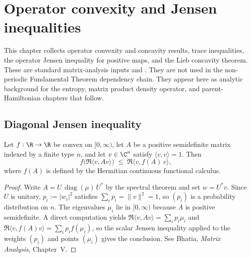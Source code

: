 
\chapter{Operator convexity and Jensen inequalities}\label{ch:operator_convexity}

This chapter collects operator convexity and concavity results, trace
inequalities, the operator Jensen inequality for positive maps, and the Lieb
concavity theorem. These are standard matrix-analysis inputs
\cite[Chapter~V]{Bhatia1997Matrix} and
\cite[Theorem~5.1]{Wolf2012Quantum}. They are not used in the non-periodic
Fundamental Theorem dependency chain. They appear here as analytic background
for the entropy, matrix product density operator, and parent-Hamiltonian
chapters that follow.

\section{Diagonal Jensen inequality}

\begin{lemma}\label{lem:diagonal_jensen_of_convexOn}
    \leanok
    Let $f:\R\to\R$ be convex on $[0,\infty)$, let $A$ be a positive
    semidefinite matrix indexed by a finite type $n$, and let $v\in\C^n$
    satisfy $\langle v,v\rangle=1$. Then
    \[
        f\!\bigl(\Re\langle v, A v\rangle\bigr)
        \;\le\;
        \Re\langle v, f(A)\,v\rangle,
    \]
    where $f(A)$ is defined by the Hermitian continuous functional calculus.
\end{lemma}

\begin{proof}\leanok
    Write $A=U\,\operatorname{diag}(\mu)\,U^{\ast}$ by the spectral
    theorem and set $w=U^{\ast}v$. Since $U$ is unitary,
    $p_i:=\lvert w_i\rvert^2$ satisfies $\sum_i p_i=\lVert v\rVert^2=1$,
    so $(p_i)$ is a probability distribution on $n$. The eigenvalues
    $\mu_i$ lie in $[0,\infty)$ because $A$ is positive semidefinite.
    A direct computation yields
    $\Re\langle v,Av\rangle=\sum_i p_i\mu_i$ and
    $\Re\langle v,f(A)v\rangle=\sum_i p_i f(\mu_i)$, so the scalar Jensen
    inequality applied to the weights $(p_i)$ and points $(\mu_i)$ gives
    the conclusion. See Bhatia, \emph{Matrix Analysis}, Chapter~V.
\end{proof}

